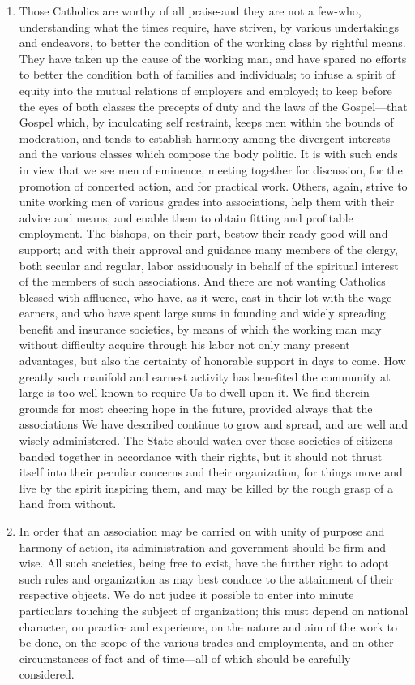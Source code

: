 \documentclass{book}
\begin{document}
\begin{enumerate}
	\item Those Catholics are worthy of all praise-and they are not a few-who, understanding what the times require, have striven, by various undertakings and endeavors, to better the condition of the working class by rightful means. They have taken up the cause of the working man, and have spared no efforts to better the condition both of families and individuals; to infuse a spirit of equity into the mutual relations of employers and employed; to keep before the eyes of both classes the precepts of duty and the laws of the Gospel—that Gospel which, by inculcating self restraint, keeps men within the bounds of moderation, and tends to establish harmony among the divergent interests and the various classes which compose the body politic. It is with such ends in view that we see men of eminence, meeting together for discussion, for the promotion of concerted action, and for practical work. Others, again, strive to unite working men of various grades into associations, help them with their advice and means, and enable them to obtain fitting and profitable employment. The bishops, on their part, bestow their ready good will and support; and with their approval and guidance many members of the clergy, both secular and regular, labor assiduously in behalf of the spiritual interest of the members of such associations. And there are not wanting Catholics blessed with affluence, who have, as it were, cast in their lot with the wage-earners, and who have spent large sums in founding and widely spreading benefit and insurance societies, by means of which the working man may without difficulty acquire through his labor not only many present advantages, but also the certainty of honorable support in days to come. How greatly such manifold and earnest activity has benefited the community at large is too well known to require Us to dwell upon it. We find therein grounds for most cheering hope in the future, provided always that the associations We have described continue to grow and spread, and are well and wisely administered. The State should watch over these societies of citizens banded together in accordance with their rights, but it should not thrust itself into their peculiar concerns and their organization, for things move and live by the spirit inspiring them, and may be killed by the rough grasp of a hand from without.


	\item In order that an association may be carried on with unity of purpose and harmony of action, its administration and government should be firm and wise. All such societies, being free to exist, have the further right to adopt such rules and organization as may best conduce to the attainment of their respective objects. We do not judge it possible to enter into minute particulars touching the subject of organization; this must depend on national character, on practice and experience, on the nature and aim of the work to be done, on the scope of the various trades and employments, and on other circumstances of fact and of time—all of which should be carefully considered.



\end{enumerate}
\end{document}
